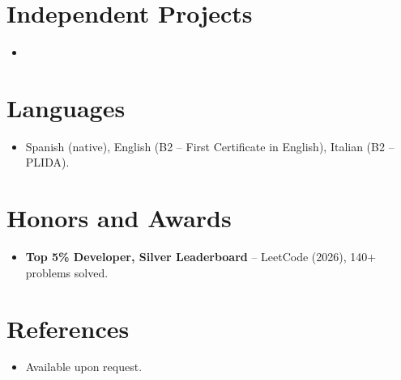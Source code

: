 \documentclass[11pt,a4paper,sans]{moderncv}
\begin{document}

\section{Independent Projects}
\vspace{1pt}
\begin{itemize}

\item{}

\end{itemize}


\section{Languages}
\vspace{1pt}
\begin{itemize}
\item Spanish (native), English (B2 -- First Certificate in English), Italian (B2 -- PLIDA).
\end{itemize}


\section{Honors and Awards}
\vspace{1pt}
\begin{itemize}
\item{\textbf{Top 5\% Developer, Silver Leaderboard} -- LeetCode (2026), 140+ problems solved.}
\end{itemize}


\section{References}
\vspace{1pt}
\begin{itemize}
\item{Available upon request.}
\end{itemize}
\end{document}
